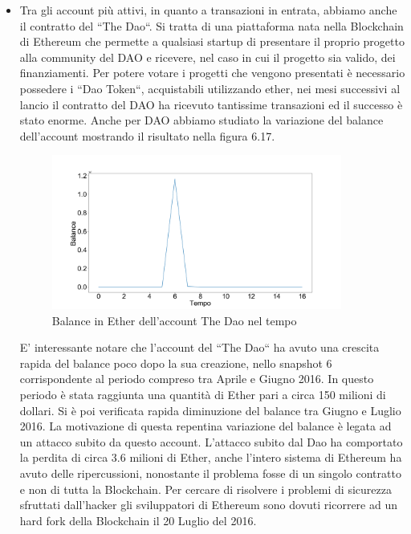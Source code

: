 \documentclass[12pt]{report}
\begin{document}
\begin{itemize}
    \item Tra gli account più attivi, in quanto a transazioni in entrata, abbiamo anche il contratto del ``The Dao``. Si tratta di una piattaforma nata nella Blockchain di Ethereum che permette a qualsiasi startup di presentare il proprio progetto alla community del DAO e ricevere, nel caso in cui il progetto sia valido, dei finanziamenti. Per potere votare i progetti che vengono presentati è necessario possedere i ``Dao Token``, acquistabili utilizzando ether, nei mesi successivi al lancio il contratto del DAO ha ricevuto tantissime transazioni ed il successo è stato enorme.
    Anche per DAO abbiamo studiato la variazione del balance dell'account mostrando il risultato nella figura 6.17.
    \begin{figure}[H]
    \centering\includegraphics[width=0.9\textwidth]{TheDao.png}
    \caption{Balance in Ether dell'account The Dao nel tempo}
    \end{figure}
    
    E' interessante notare che l'account del ``The Dao`` ha avuto una crescita rapida del balance poco dopo la sua creazione, nello snapshot 6 corrispondente al periodo compreso tra Aprile e Giugno 2016. In questo periodo è stata raggiunta una quantità di Ether pari a circa 150 milioni di dollari. Si è poi verificata rapida diminuzione del balance tra Giugno e Luglio 2016.
    La motivazione di questa repentina variazione del balance è legata ad un attacco subito da questo account.
    L'attacco subito dal Dao ha comportato la perdita di circa 3.6 milioni di Ether, anche l'intero sistema di Ethereum ha avuto delle ripercussioni, nonostante il problema fosse di un singolo contratto e non di tutta la Blockchain.
    Per cercare di risolvere i problemi di sicurezza sfruttati dall'hacker gli sviluppatori di Ethereum sono dovuti ricorrere ad un hard fork della Blockchain il 20 Luglio del 2016.
    
\end{itemize}
\end{document}
